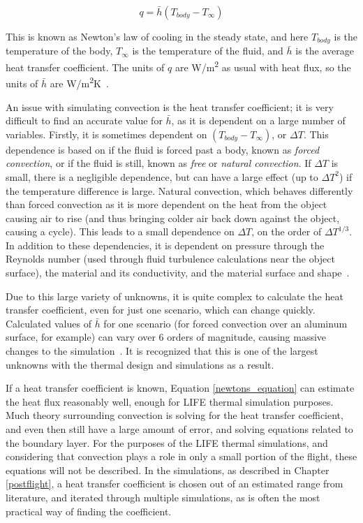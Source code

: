 \begin{equation}\label{newtons_equation}
    q = \bar{h}(T_{body} - T_{\infty})
\end{equation}

This is known as Newton's law of cooling in the steady state, and here $T_{body}$ is the temperature of the body, $T_{\infty}$ is the temperature of the fluid, and $\bar{h}$ is the average heat transfer coefficient. The units of $q$ are W/m\textsuperscript{2} as usual with heat flux, so the units of $\bar{h}$ are W/m\textsuperscript{2}K~\citep{heat_transfer_textbook}.

An issue with simulating convection is the heat transfer coefficient; it is very difficult to find an accurate value for $\bar{h}$, as it is dependent on a large number of variables. Firstly, it is sometimes dependent on $(T_{body} - T_{\infty})$, or $\Delta T$. This dependence is based on if the fluid is forced past a body, known as \textit{forced convection}, or if the fluid is still, known as \textit{free} or \textit{natural convection}. If $\Delta T$ is small, there is a negligible dependence, but can have a large effect (up to $\Delta T^2$) if the temperature difference is large. Natural convection, which behaves differently than forced convection as it is more dependent on the heat from the object causing air to rise (and thus bringing colder air back down against the object, causing a cycle). This leads to a small dependence on $\Delta T$, on the order of $\Delta T^{1/3}$. In addition to these dependencies, it is dependent on pressure through the Reynolds number (used through fluid turbulence calculations near the object surface), the material and its conductivity, and the material surface and shape~\citep{heat_transfer_textbook}.

Due to this large variety of unknowns, it is quite complex to calculate the heat transfer coefficient, even for just one scenario, which can change quickly. Calculated values of $\bar{h}$ for one scenario (for forced convection over an aluminum surface, for example) can vary over 6 orders of magnitude, causing massive changes to the simulation~\citep{heat_transfer_textbook}. It is recognized that this is one of the largest unknowns with the thermal design and simulations as a result.

If a heat transfer coefficient is known, Equation \ref{newtons_equation} can estimate the heat flux reasonably well, enough for LIFE thermal simulation purposes. Much theory surrounding convection is solving for the heat transfer coefficient, and even then still have a large amount of error, and solving equations related to the boundary layer. For the purposes of the LIFE thermal simulations, and considering that convection plays a role in only a small portion of the flight, these equations will not be described. In the simulations, as described in Chapter \ref{postflight}, a heat transfer coefficient is chosen out of an estimated range from literature, and iterated through multiple simulations, as is often the most practical way of finding the coefficient. 

